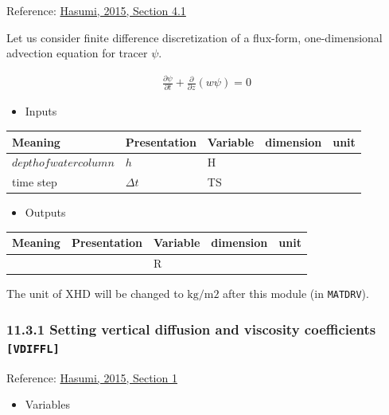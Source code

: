 Reference:
\href{https://ccsr.aori.u-tokyo.ac.jp/~hasumi/COCO/coco4.pdf}{Hasumi,
2015, Section 4.1}

Let us consider finite difference discretization of a flux-form,
one-dimensional advection equation for tracer \(\psi\).

\begin{eqnarray}
    \frac{\partial \psi}{\partial t} + \frac{\partial}{\partial z} (w\psi) = 0
\end{eqnarray}

\begin{itemize}
\tightlist
\item
  Inputs
\end{itemize}

\setlength\LTleft{0pt}\setlength\LTright{0pt}\begin{longtable}[]{@{}lllll@{}}
\toprule\relax
Meaning & Presentation & Variable & dimension & unit\tabularnewline
\midrule\relax
\endhead
\(depth of water column\) & \(h\) & H & &\tabularnewline
time step & \(\Delta t\) & TS & &\tabularnewline
\bottomrule
\end{longtable}

\begin{itemize}
\tightlist
\item
  Outputs
\end{itemize}

\setlength\LTleft{0pt}\setlength\LTright{0pt}\begin{longtable}[]{@{}lllll@{}}
\toprule\relax
Meaning & Presentation & Variable & dimension & unit\tabularnewline
\midrule\relax
\endhead
& & R & &\tabularnewline
\bottomrule
\end{longtable}

The unit of XHD will be changed to \(\mathrm{kg/m2}\) after this module
(in \texttt{MATDRV}).

\hypertarget{setting-vertical-diffusion-and-viscosity-coefficients-vdiffl}{%
\subsubsection{\texorpdfstring{11.3.1 Setting vertical diffusion and
viscosity coefficients
\texttt{{[}VDIFFL{]}}}{11.3.1 Setting vertical diffusion and viscosity coefficients {[}VDIFFL{]}}}\label{setting-vertical-diffusion-and-viscosity-coefficients-vdiffl}}

Reference:
\href{https://ccsr.aori.u-tokyo.ac.jp/~hasumi/COCO/coco4.pdf}{Hasumi,
2015, Section 1}

\begin{itemize}
\tightlist
\item
  Variables
\end{itemize}

